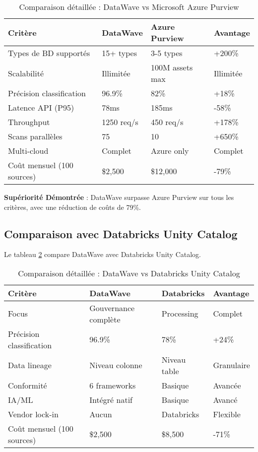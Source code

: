 \begin{table}[htpb]
\centering
\caption{Comparaison détaillée : DataWave vs Microsoft Azure Purview}
\label{tab:comparaison_azure}
\begin{tabular}{|p{}|p{}|p{}|p{}|}
\hline
\textbf{Critère} & \textbf{DataWave} & \textbf{Azure Purview} & \textbf{Avantage} \\
\hline
Types de BD supportés & 15+ types & 3-5 types & +200\% \\
\hline
Scalabilité & Illimitée & 100M assets max & Illimitée \\
\hline
Précision classification & 96.9\% & 82\% & +18\% \\
\hline
Latence API (P95) & 78ms & 185ms & -58\% \\
\hline
Throughput & 1250 req/s & 450 req/s & +178\% \\
\hline
Scans parallèles & 75 & 10 & +650\% \\
\hline
Multi-cloud & Complet & Azure only & Complet \\
\hline
Coût mensuel (100 sources) & \$2,500 & \$12,000 & -79\% \\
\hline
\end{tabular}
\end{table}

\textbf{Supériorité Démontrée} : DataWave surpasse Azure Purview sur tous les critères, avec une réduction de coûts de 79\%.

\subsection{Comparaison avec Databricks Unity Catalog}

Le tableau \ref{tab:comparaison_databricks} compare DataWave avec Databricks Unity Catalog.

\begin{table}[htpb]
\centering
\caption{Comparaison détaillée : DataWave vs Databricks Unity Catalog}
\label{tab:comparaison_databricks}
\begin{tabular}{|p{}|p{}|p{}|p{}|}
\hline
\textbf{Critère} & \textbf{DataWave} & \textbf{Databricks} & \textbf{Avantage} \\
\hline
Focus & Gouvernance complète & Processing & Complet \\
\hline
Précision classification & 96.9\% & 78\% & +24\% \\
\hline
Data lineage & Niveau colonne & Niveau table & Granulaire \\
\hline
Conformité & 6 frameworks & Basique & Avancée \\
\hline
IA/ML & Intégré natif & Basique & Avancé \\
\hline
Vendor lock-in & Aucun & Databricks & Flexible \\
\hline
Coût mensuel (100 sources) & \$2,500 & \$8,500 & -71\% \\
\hline
\end{tabular}
\end{table}

